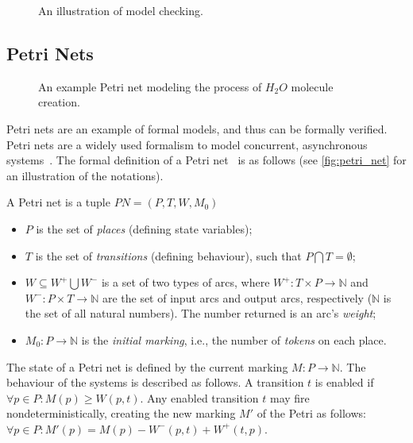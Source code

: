 \begin{figure}[!ht]
	\centering
	
	\caption{An illustration of model checking.}
	\label{fig:model_checking}
\end{figure}

\subsection{Petri Nets}\label{ssec:petri-net}

\begin{figure}[!ht]
	\centering
	
	\caption{An example Petri net modeling the process of \(H_2O\) molecule creation.}
	\label{fig:petri_net}
\end{figure}

Petri nets are an example of formal models, and thus can be formally verified. Petri nets are a widely used formalism to model concurrent, asynchronous systems~\cite{24143}. The formal definition of a Petri net~\cite{REISIG19911} is as follows (see \autoref{fig:petri_net} for an illustration of the notations).

\begin{definition}
	
	A Petri net is a tuple \( PN = (P, T, W, M_0) \)
	
	\begin{itemize}
		\item \(P\) is the set of \emph{places} (defining state variables);
		\item \(T\) is the set of \emph{transitions} (defining behaviour), such that \( P \bigcap T = \emptyset \);
		\item \(W \subseteq W^+ \bigcup W^- \) is a set of two types of arcs, where \(  W^+ : T \times P \rightarrow \mathbb{N}\) and \( W^- : P \times T \rightarrow \mathbb{N} \) are the set of input arcs and output arcs, respectively (\( \mathbb{N} \) is the set of all natural numbers). The number returned is an arc's \emph{weight};
		\item \(M_0 : P \rightarrow \mathbb{N} \) is the \emph{initial marking}, i.e., the number of \emph{tokens} on each place.
	\end{itemize}
\end{definition}

The state of a Petri net is defined by the current marking \( M : P \rightarrow \mathbb{N} \). The behaviour of the systems is described as follows. A transition \( t \) is enabled if \( \forall p \in P : M(p) \geq W(p, t) \). Any enabled transition \(t\) may fire nondeterministically, creating the new marking \( M' \) of the Petri as follows: \( \forall p \in P : M'(p) = M(p) - W^-(p, t) + W^+(t, p) \).

